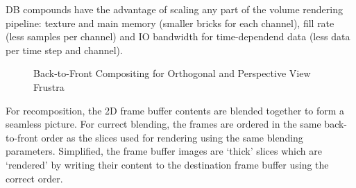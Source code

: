 \documentclass[10pt,a4]{scrartcl}
\begin{document}
DB compounds have the advantage of scaling any part of the volume
rendering pipeline: texture and main memory (smaller bricks for each
channel), fill rate (less samples per channel) and IO bandwidth for
time-dependend data (less data per time step and channel).

\begin{figure}[h!t]
  \hfil
  {\caption{\small\label{fBlend}Back-to-Front Com\-po\-siting for
      Orthogonal and Perspective View Frustra}}
\end{figure}
For recomposition, the 2D frame buffer contents are blended together to
form a seamless picture. For currect blending, the frames are ordered in
the same back-to-front order as the slices used for rendering using the
same blending parameters. Simplified, the frame buffer images are
`thick' slices which are `rendered' by writing their content to the
destination frame buffer using the correct order. 
\end{document}
